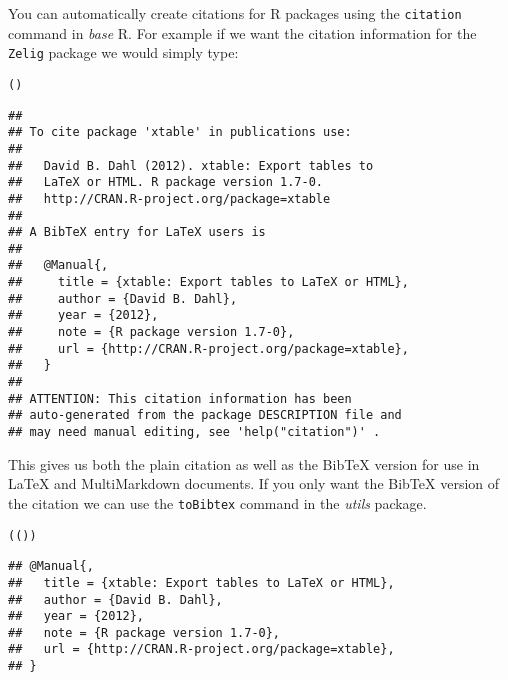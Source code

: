 You can automatically create citations for R packages using the \texttt{citation} command in \emph{base} R. For example if we want the citation information for the \texttt{Zelig} package we would simply type:

\begin{knitrout}
\color{fgcolor}\begin{kframe}
\begin{alltt}
()
\end{alltt}
\begin{verbatim}
## 
## To cite package 'xtable' in publications use:
## 
##   David B. Dahl (2012). xtable: Export tables to
##   LaTeX or HTML. R package version 1.7-0.
##   http://CRAN.R-project.org/package=xtable
## 
## A BibTeX entry for LaTeX users is
## 
##   @Manual{,
##     title = {xtable: Export tables to LaTeX or HTML},
##     author = {David B. Dahl},
##     year = {2012},
##     note = {R package version 1.7-0},
##     url = {http://CRAN.R-project.org/package=xtable},
##   }
## 
## ATTENTION: This citation information has been
## auto-generated from the package DESCRIPTION file and
## may need manual editing, see 'help("citation")' .
\end{verbatim}
\end{kframe}
\end{knitrout}


\noindent This gives us both the plain citation as well as the BibTeX version for use in LaTeX and MultiMarkdown documents. If you only want the BibTeX version of the citation we can use the \texttt{toBibtex} command in the \emph{utils} package.

\begin{knitrout}
\color{fgcolor}\begin{kframe}
\begin{alltt}
(())
\end{alltt}
\begin{verbatim}
## @Manual{,
##   title = {xtable: Export tables to LaTeX or HTML},
##   author = {David B. Dahl},
##   year = {2012},
##   note = {R package version 1.7-0},
##   url = {http://CRAN.R-project.org/package=xtable},
## }
\end{verbatim}
\end{kframe}
\end{knitrout}


